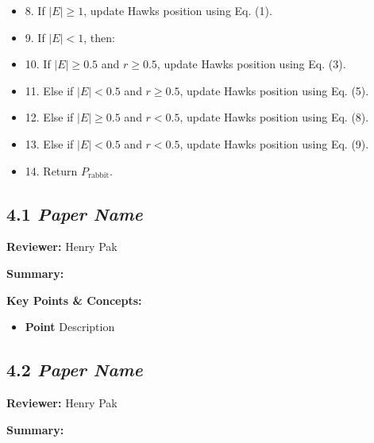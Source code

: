 \documentclass{article}
\begin{document}
\begin{itemize}
\begin{itemize}
      \item 8. If \(|E| \geq 1\), update Hawks position using Eq. (1). 
      \item 9. If \(|E| < 1\), then:  
      \item 10. If \(|E| \geq 0.5\) and \(r \geq 0.5\), update Hawks position using Eq. (3). 
      \item 11. Else if \(|E| < 0.5\) and \(r \geq 0.5\), update Hawks position using Eq. (5).  
      \item 12. Else if \(|E| \geq 0.5\) and \(r < 0.5\), update Hawks position using Eq. (8).  
      \item 13. Else if \(|E| < 0.5\) and \(r < 0.5\), update Hawks position using Eq. (9).  
      \item 14. Return \(P_{\text{rabbit}}\).  
    \end{itemize}
\end{itemize}

\subsection*{4.1 \textit{Paper Name}}

\hspace*{\parindent}\textbf{Reviewer:} Henry Pak

\vspace{0.3cm}

\textbf{Summary:}

\vspace{0.3cm}

\textbf{Key Points \& Concepts:}
\begin{itemize}
  \item \textbf{Point} Description
\end{itemize}

\subsection*{4.2 \textit{Paper Name}}

\hspace*{\parindent}\textbf{Reviewer:} Henry Pak

\vspace{0.3cm}

\textbf{Summary:}

\vspace{0.3cm}
\end{document}
